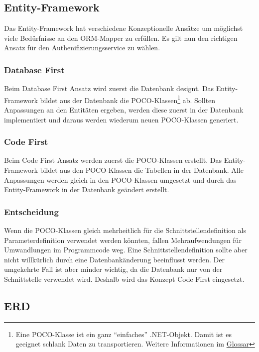 \subsection{Entity-Framework}\label{entity-framework}

Das Entity-Framework hat verschiedene Konzeptionelle Ansätze um
möglichst viele Bedürfnisse an den ORM-Mapper zu erfüllen. Es gilt nun
den richtigen Ansatz für den Authenifizierungsservice zu wählen.

\subsubsection{Database First}\label{database-first}

Beim Database First Ansatz wird zuerst die Datenbank designt. Das
Entity-Framework bildet aus der Datenbank die POCO-Klassen\footnote{Eine
  POCO-Klasse ist ein ganz ``einfaches'' .NET-Objekt. Damit ist es
  geeignet schlank Daten zu transportieren. Weitere Informationen im
  \protect\hyperlink{glossar}{Glossar}} ab. Sollten Anpassungen an den
Entitäten ergeben, werden diese zuerst in der Datenbank implementiert
und daraus werden wiederum neuen POCO-Klassen generiert.

\subsubsection{Code First}\label{code-first}

Beim Code First Ansatz werden zuerst die POCO-Klassen erstellt. Das
Entity-Framework bildet aus den POCO-Klassen die Tabellen in der
Datenbank. Alle Anpassungen werden gleich in den POCO-Klassen umgesetzt
und durch das Entity-Framework in der Datenbank geändert erstellt.

\subsubsection{Entscheidung}\label{entscheidung}

Wenn die POCO-Klassen gleich mehrheitlich für die
Schnittstellendefinition als Parameterdefinition verwendet werden
könnten, fallen Mehraufwendungen für Umwandlungen im Programmcode weg.
Eine Schnittstellendefinition sollte aber nicht willkürlich durch eine
Datenbankänderung beeinflusst werden. Der umgekehrte Fall ist aber
minder wichtig, da die Datenbank nur von der Schnittstelle verwendet
wird. Deshalb wird das Konzept Code First eingesetzt.

\subsection{ERD}\label{erd}

